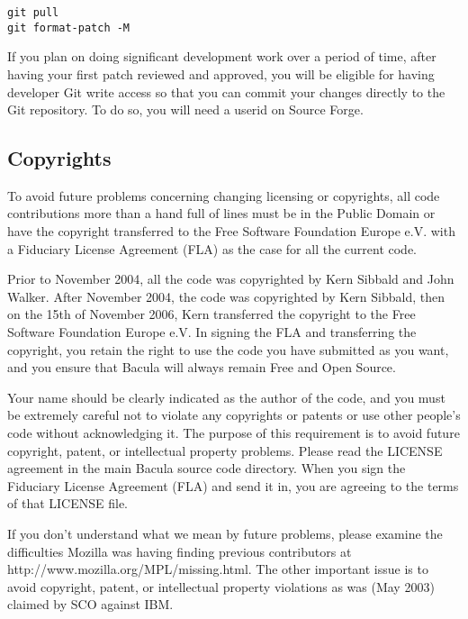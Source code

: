 \begin{verbatim}
git pull
git format-patch -M
\end{verbatim}

If you plan on doing significant development work over a period of time,
after having your first patch reviewed and approved, you will be eligible
for having developer Git write access so that you can commit your changes
directly to the Git repository.  To do so, you will need a userid on Source
Forge.

\subsection{Copyrights}

To avoid future problems concerning changing licensing or
copyrights, all code contributions more than a hand full of lines
must be in the Public Domain or have the copyright transferred to
the Free Software Foundation Europe e.V. with a Fiduciary License
Agreement (FLA) as the case for all the current code.  

Prior to November 2004, all the code was copyrighted by Kern Sibbald and
John Walker.  After November 2004, the code was copyrighted by Kern
Sibbald, then on the 15th of November 2006, Kern transferred the copyright
to the Free Software Foundation Europe e.V. In signing the FLA and
transferring the copyright, you retain the right to use the code you have
submitted as you want, and you ensure that Bacula will always remain Free
and Open Source.

Your name should be clearly indicated as the author of the code, and you
must be extremely careful not to violate any copyrights or patents or use
other people's code without acknowledging it.  The purpose of this
requirement is to avoid future copyright, patent, or intellectual property
problems.  Please read the LICENSE agreement in the main Bacula source code
directory.  When you sign the Fiduciary License Agreement (FLA) and send it
in, you are agreeing to the terms of that LICENSE file.

If you don't understand what we mean by future problems, please
examine the difficulties Mozilla was having finding
previous contributors at 
{http://www.mozilla.org/MPL/missing.html}. The other important issue is to
avoid copyright, patent, or intellectual property violations as was
(May 2003) claimed by SCO against IBM. 

